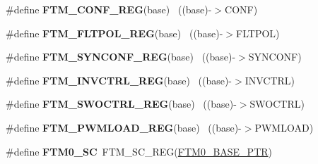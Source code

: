 \begin{DoxyCompactItemize}
\item 
\hypertarget{group___f_t_m___register___accessor___macros_gaccd05c478b64606ec1ceb2ef17e38dc4}{}\#define {\bfseries F\+T\+M\+\_\+\+C\+O\+N\+F\+\_\+\+R\+E\+G}(base)                                          ~((base)-\/$>$C\+O\+N\+F)\label{group___f_t_m___register___accessor___macros_gaccd05c478b64606ec1ceb2ef17e38dc4}

\item 
\hypertarget{group___f_t_m___register___accessor___macros_ga031ade84211f87bed77fb3b71dfa67e6}{}\#define {\bfseries F\+T\+M\+\_\+\+F\+L\+T\+P\+O\+L\+\_\+\+R\+E\+G}(base)                                      ~((base)-\/$>$F\+L\+T\+P\+O\+L)\label{group___f_t_m___register___accessor___macros_ga031ade84211f87bed77fb3b71dfa67e6}

\item 
\hypertarget{group___f_t_m___register___accessor___macros_gab945eb614e7150c2e0048fb7b684ebad}{}\#define {\bfseries F\+T\+M\+\_\+\+S\+Y\+N\+C\+O\+N\+F\+\_\+\+R\+E\+G}(base)                                    ~((base)-\/$>$S\+Y\+N\+C\+O\+N\+F)\label{group___f_t_m___register___accessor___macros_gab945eb614e7150c2e0048fb7b684ebad}

\item 
\hypertarget{group___f_t_m___register___accessor___macros_gaa802450fbaa2dc424ffe4838d5c9a89b}{}\#define {\bfseries F\+T\+M\+\_\+\+I\+N\+V\+C\+T\+R\+L\+\_\+\+R\+E\+G}(base)                                    ~((base)-\/$>$I\+N\+V\+C\+T\+R\+L)\label{group___f_t_m___register___accessor___macros_gaa802450fbaa2dc424ffe4838d5c9a89b}

\item 
\hypertarget{group___f_t_m___register___accessor___macros_ga9d8f5821b8f521665946f61a878a3963}{}\#define {\bfseries F\+T\+M\+\_\+\+S\+W\+O\+C\+T\+R\+L\+\_\+\+R\+E\+G}(base)                                    ~((base)-\/$>$S\+W\+O\+C\+T\+R\+L)\label{group___f_t_m___register___accessor___macros_ga9d8f5821b8f521665946f61a878a3963}

\item 
\hypertarget{group___f_t_m___register___accessor___macros_ga2788d558fe351bdcafa92b44f8611c03}{}\#define {\bfseries F\+T\+M\+\_\+\+P\+W\+M\+L\+O\+A\+D\+\_\+\+R\+E\+G}(base)                                    ~((base)-\/$>$P\+W\+M\+L\+O\+A\+D)\label{group___f_t_m___register___accessor___macros_ga2788d558fe351bdcafa92b44f8611c03}

\item 
\hypertarget{group___f_t_m___register___accessor___macros_gaa8cb4b7bcccc202d9256a35e2557c359}{}\#define {\bfseries F\+T\+M0\+\_\+\+S\+C}~F\+T\+M\+\_\+\+S\+C\+\_\+\+R\+E\+G(\hyperlink{group___f_t_m___peripheral_gae712c29b7abcf338d8f8f6418683fa66}{F\+T\+M0\+\_\+\+B\+A\+S\+E\+\_\+\+P\+T\+R})\label{group___f_t_m___register___accessor___macros_gaa8cb4b7bcccc202d9256a35e2557c359}


\end{DoxyCompactItemize}
